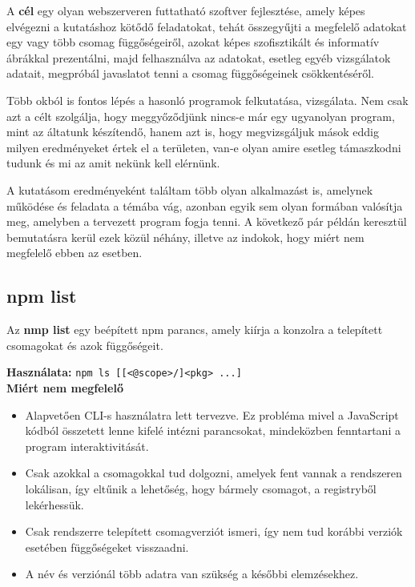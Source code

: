 	A \textbf{cél} egy olyan webszerveren futtatható szoftver fejlesztése, amely képes elvégezni a kutatáshoz kötődő feladatokat, tehát összegyűjti a megfelelő adatokat egy vagy több csomag függőségeiről, azokat képes szofisztikált és informatív ábrákkal prezentálni, majd felhasználva az adatokat, esetleg egyéb vizsgálatok adatait, megpróbál javaslatot tenni a csomag függőségeinek csökkentéséről.
	
	\pagebreak


Több okból is fontos lépés a hasonló programok felkutatása, vizsgálata. Nem csak azt a célt szolgálja, hogy meggyőződjünk nincs-e már egy ugyanolyan program, mint az áltatunk készítendő, hanem azt is, hogy megvizsgáljuk mások eddig milyen eredményeket értek el a területen, van-e olyan amire esetleg támaszkodni tudunk és mi az amit nekünk kell elérnünk.

A kutatásom eredményeként találtam több olyan alkalmazást is, amelynek működése és feladata a témába vág, azonban egyik sem olyan formában valósítja meg, amelyben a tervezett program fogja tenni. A következő pár példán keresztül bemutatásra kerül ezek közül néhány, illetve az indokok, hogy miért nem megfelelő ebben az esetben.

	\subsection{npm list}
	
	Az \textbf{nmp list} egy beépített npm parancs, amely kiírja a konzolra a telepített csomagokat és azok függőségeit.
	
	\textbf{Használata:} \texttt{npm ls [[<@scope>/]<pkg> ...]}\\
	
	\textbf{Miért nem megfelelő}
	\begin{itemize}
		\item Alapvetően CLI-s használatra lett tervezve. Ez probléma mivel a JavaScript kódból összetett lenne kifelé intézni parancsokat, mindeközben fenntartani a program interaktivitását.
		\item Csak azokkal a csomagokkal tud dolgozni, amelyek fent vannak a rendszeren lokálisan, így eltűnik a lehetőség, hogy bármely csomagot, a registryből lekérhessük.
		\item Csak rendszerre telepített csomagverziót ismeri, így nem tud korábbi verziók esetében függőségeket visszaadni.
		\item A név és verziónál több adatra van szükség a későbbi elemzésekhez.
	\end{itemize}
	
